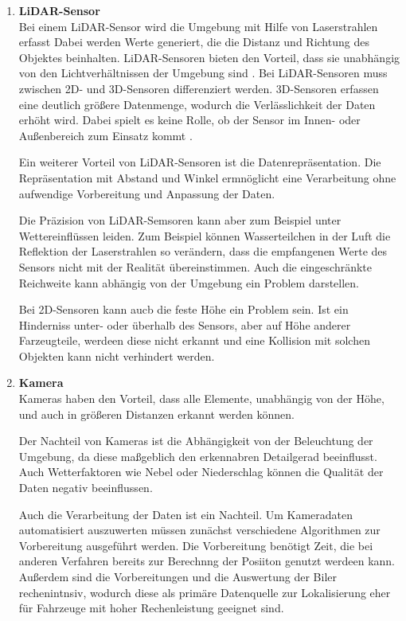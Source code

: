 \begin{enumerate}
    \item \textbf{LiDAR-Sensor}\\
    Bei einem LiDAR-Sensor wird die Umgebung mit Hilfe von Laserstrahlen erfasst Dabei werden Werte generiert, die die Distanz und Richtung des Objektes beinhalten. 
    LiDAR-Sensoren bieten den Vorteil, dass sie unabhängig von den Lichtverhältnissen der Umgebung sind \cite{lidar}. 
    Bei LiDAR-Sensoren muss zwischen 2D- und 3D-Sensoren differenziert werden. 3D-Sensoren erfassen eine deutlich größere Datenmenge, 
    wodurch die Verlässlichkeit der Daten erhöht wird. Dabei spielt es keine Rolle, ob der Sensor im Innen- oder Außenbereich zum Einsatz kommt \cite{lidar}. 

    Ein weiterer Vorteil von LiDAR-Sensoren ist die Datenrepräsentation.
    Die Repräsentation mit Abstand und Winkel ermnöglicht eine Verarbeitung ohne aufwendige Vorbereitung und Anpassung der Daten.
    
    Die Präzision von LiDAR-Semsoren kann aber zum Beispiel unter Wettereinflüssen leiden. 
    Zum Beispiel können Wasserteilchen in der Luft die Reflektion der Laserstrahlen so verändern, dass die empfangenen Werte des Sensors nicht mit der Realität übereinstimmen.
    Auch die eingeschränkte Reichweite kann abhängig von der Umgebung ein Problem darstellen.

    Bei 2D-Sensoren kann aucb die feste Höhe ein Problem sein.
    Ist ein Hinderniss unter- oder überhalb des Sensors, aber auf Höhe anderer Farzeugteile, werdeen diese nicht erkannt und eine Kollision mit 
    solchen Objekten kann nicht verhindert werden. 

    \item \textbf{Kamera}\\
    Kameras haben den Vorteil, dass alle Elemente, unabhängig von der Höhe, und auch in größeren Distanzen erkannt werden können. 

    Der Nachteil von Kameras ist die Abhängigkeit von der Beleuchtung der Umgebung, da diese maßgeblich den erkennabren Detailgerad beeinflusst.
    Auch Wetterfaktoren wie Nebel oder Niederschlag können die Qualität der Daten negativ beeinflussen.

    Auch die Verarbeitung der Daten ist ein Nachteil. 
    Um Kameradaten automatisiert auszuwerten müssen zunächst verschiedene Algorithmen zur Vorbereitung ausgeführt werden. 
    Die Vorbereitung benötigt Zeit, die bei anderen Verfahren bereits zur Berechnng der Posiiton genutzt werdeen kann.
    Außerdem sind die Vorbereitungen und die Auswertung der Biler rechenintnsiv, wodurch diese als primäre Datenquelle zur Lokalisierung 
    eher für Fahrzeuge mit hoher Rechenleistung geeignet sind.


\end{enumerate}
